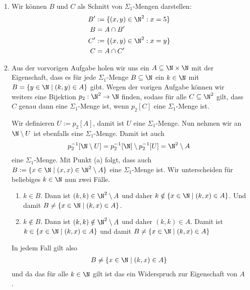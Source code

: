 \begin{solution}

\phantom{}
	\begin{enumerate}[label = (\alph*)]
		\item
		Wir können $B$ und $C$ als Schnitt von $\Sigma_1$-Mengen darstellen:
		\begin{align*}
			B^{\prime} &:= \{(x,y) \in \N^2: x = 5\} \\
			B &= A \cap B^{\prime} \\
			C^{\prime} &:= \{(x,y) \in \N^2: x = y\} \\
			C &= A \cap C^{\prime}
		\end{align*}
		\item Aus der vorvorigen Aufgabe holen wir uns ein $A \subseteq \N \times \N$ mit der Eigenschaft, dass es für jede $\Sigma_1$-Menge $B \subseteq \N$ ein $k \in \N$ mit $B = \{y \in \N \mid (k,y) \in A\}$ gibt. Wegen der vorigen Aufgabe können wir weiters eine Bijektion $p_2: \N^2 \to \N$ finden, sodass für alle $C \subseteq \N^2$ gilt, dass $C$ genau dann eine $\Sigma_1$-Menge ist, wenn $p_2[C]$ eine $\Sigma_1$-Menge ist.

		Wir definieren $U := p_2[A]$, damit ist $U$ eine $\Sigma_1$-Menge. Nun nehmen wir an $\N \setminus U$ ist ebenfalls eine $\Sigma_1$-Menge. Damit ist auch
		\begin{align*}
			p_2^{-1}[\N \setminus U] = p_2^{-1}[\N] \setminus p_2^{-1}[U] = \N^2 \setminus A
		\end{align*}
		eine $\Sigma_1$-Menge. Mit Punkt (a) folgt, dass auch $B := \{x \in \N \mid (x,x) \in \N^2 \setminus A\}$ eine $\Sigma_1$-Menge ist. Wir unterscheiden für beliebiges $k \in \N$ nun zwei Fälle.
		\begin{enumerate}[label = Fall \arabic*:]
			\item $k \in B$. Dann ist $(k,k) \in \N^2 \setminus A$ und daher $k \notin \{x \in \N \mid (k,x) \in A\}$. Und damit $B \neq \{x \in \N \mid (k,x) \in A\}$.
			\item $k \notin B$. Dann ist $(k,k) \notin \N^2 \setminus A$ und daher $(k,k) \in A$. Damit ist  $k \in \{x \in \N \mid (k,x) \in A\}$ und damit $B \neq \{x \in \N \mid (k,x) \in A\}$
		\end{enumerate}
	In jedem Fall gilt also
	\begin{align*}
		B \neq \{x \in \N \mid (k,x) \in A\}
	\end{align*}
	und da das für alle $k \in \N$ gilt ist das ein Widerspruch zur Eigenschaft von $A$.
	\end{enumerate}

\end{solution}

